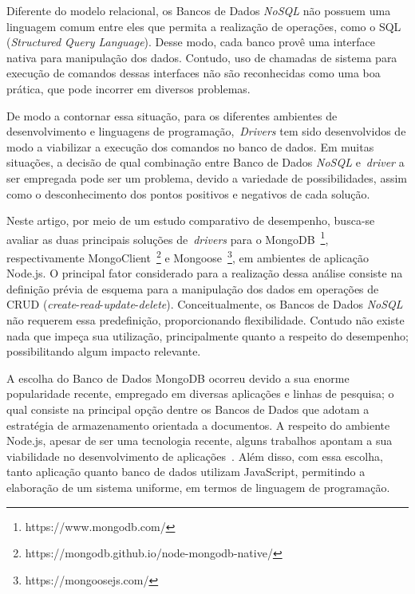 \documentclass[12pt]{article}
\begin{document}

Diferente do modelo relacional, os Bancos de Dados \textit{NoSQL} não possuem uma linguagem comum entre eles que permita a realização de operações, como o SQL (\emph{Structured Query Language}). Desse modo, cada banco provê uma interface nativa para manipulação dos dados. Contudo, uso de chamadas de sistema para execução de comandos dessas interfaces não são reconhecidas como uma boa prática, que pode incorrer em diversos problemas. %

De modo a contornar essa situação, para os diferentes ambientes de desenvolvimento e linguagens de programação,~\emph{Drivers} tem sido desenvolvidos de modo a viabilizar a execução dos comandos no banco de dados. Em muitas situações, a decisão de qual combinação entre Banco de Dados \textit{NoSQL} e~\emph{driver} a ser empregada pode ser um problema, devido a variedade de possibilidades, assim como o desconhecimento dos pontos positivos e negativos de cada solução. %

Neste artigo, por meio de um estudo comparativo de desempenho, busca-se avaliar as duas principais soluções de~\emph{drivers} para o MongoDB~\footnote{https://www.mongodb.com/}, respectivamente MongoClient~\footnote{https://mongodb.github.io/node-mongodb-native/} e Mongoose~\footnote{https://mongoosejs.com/}, em ambientes de aplicação Node.js. O principal fator considerado para a realização dessa análise consiste na definição prévia de esquema para a manipulação dos dados em operações de CRUD (\emph{create}-\emph{read}-\emph{update}-\emph{delete}). Conceitualmente, os Bancos de Dados \textit{NoSQL} não requerem essa predefinição, proporcionando flexibilidade. Contudo não existe nada que impeça sua utilização, principalmente quanto a respeito do desempenho; possibilitando algum impacto relevante.%

A escolha do Banco de Dados MongoDB ocorreu devido a sua enorme popularidade recente, empregado em diversas aplicações e linhas de pesquisa; o qual consiste na principal opção dentre os Bancos de Dados que adotam a estratégia de armazenamento orientada a documentos. %
A respeito do ambiente Node.js, apesar de ser uma tecnologia recente, alguns trabalhos apontam a sua viabilidade no desenvolvimento de aplicações~\cite{chaniotis2015node}. Além disso, com essa escolha, tanto aplicação quanto banco de dados utilizam JavaScript, permitindo a elaboração de um sistema uniforme, em termos de linguagem de programação.
\end{document}
